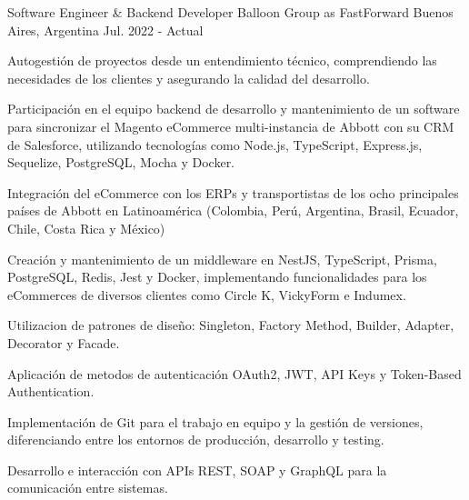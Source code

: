 

\begin{cventries}

\vspace{3.5mm}
\cventry
    {Software Engineer \& Backend Developer} %
    {Balloon Group as FastForward} %
    {Buenos Aires, Argentina} %
    {Jul. 2022 - Actual} %
    {
      \begin{cvitems} %
        \item {Autogestión de proyectos desde un entendimiento técnico, comprendiendo las necesidades de los clientes y asegurando la calidad del desarrollo.}
        \item {Participación en el equipo backend de desarrollo y mantenimiento de un software para sincronizar el Magento eCommerce multi-instancia de Abbott con su CRM de Salesforce, utilizando tecnologías como Node.js, TypeScript, Express.js, Sequelize, PostgreSQL, Mocha y Docker.}
        \item {Integración del eCommerce con los ERPs y transportistas de los ocho principales países de Abbott en Latinoamérica (Colombia, Perú, Argentina, Brasil, Ecuador, Chile, Costa Rica y México)}
        \item {Creación y mantenimiento de un middleware en NestJS, TypeScript, Prisma, PostgreSQL, Redis, Jest y Docker, implementando funcionalidades para los eCommerces de diversos clientes como Circle K, VickyForm e Indumex.}
        \item {Utilizacion de patrones de diseño: Singleton, Factory Method, Builder, Adapter, Decorator y Facade.}
        \item {Aplicación de metodos de autenticación OAuth2, JWT, API Keys y Token-Based Authentication.}
        \item {Implementación de Git para el trabajo en equipo y la gestión de versiones, diferenciando entre los entornos de producción, desarrollo y testing.}
        \item {Desarrollo e interacción con APIs REST, SOAP y GraphQL para la comunicación entre sistemas.}

\end{cvitems}}
\end{cventries}
